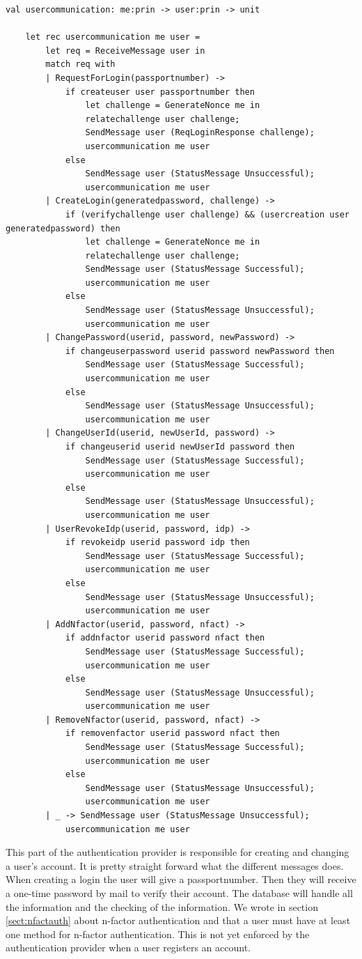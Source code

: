 \documentclass[twosided]{report}
\begin{document}
\begin{lstlisting}[style=fstar, caption={The creation and changing of a user's account}]
	val usercommunication: me:prin -> user:prin -> unit

	let rec usercommunication me user =
		let req = ReceiveMessage user in
		match req with
		| RequestForLogin(passportnumber) -> 
			if createuser user passportnumber then
				let challenge = GenerateNonce me in
				relatechallenge user challenge;
				SendMessage user (ReqLoginResponse challenge);
				usercommunication me user
			else
				SendMessage user (StatusMessage Unsuccessful);
				usercommunication me user
		| CreateLogin(generatedpassword, challenge) ->
			if (verifychallenge user challenge) && (usercreation user generatedpassword) then
				let challenge = GenerateNonce me in
				relatechallenge user challenge;
				SendMessage user (StatusMessage Successful);
				usercommunication me user
			else
				SendMessage user (StatusMessage Unsuccessful);
				usercommunication me user
		| ChangePassword(userid, password, newPassword) ->
			if changeuserpassword userid password newPassword then
				SendMessage user (StatusMessage Successful);
				usercommunication me user
			else
				SendMessage user (StatusMessage Unsuccessful);
				usercommunication me user
		| ChangeUserId(userid, newUserId, password) ->
			if changeuserid userid newUserId password then
				SendMessage user (StatusMessage Successful);
				usercommunication me user
			else
				SendMessage user (StatusMessage Unsuccessful);
				usercommunication me user
		| UserRevokeIdp(userid, password, idp) ->
			if revokeidp userid password idp then
				SendMessage user (StatusMessage Successful);
				usercommunication me user
			else
				SendMessage user (StatusMessage Unsuccessful);
				usercommunication me user
		| AddNfactor(userid, password, nfact) ->
			if addnfactor userid password nfact then
				SendMessage user (StatusMessage Successful);
				usercommunication me user
			else
				SendMessage user (StatusMessage Unsuccessful);
				usercommunication me user
		| RemoveNfactor(userid, password, nfact) ->
			if removenfactor userid password nfact then
				SendMessage user (StatusMessage Successful);
				usercommunication me user
			else
				SendMessage user (StatusMessage Unsuccessful);
				usercommunication me user
		| _ -> SendMessage user (StatusMessage Unsuccessful);
			usercommunication me user
\end{lstlisting}

This part of the authentication provider is responsible for creating and changing a user's account. It is pretty straight forward what the different messages does. When creating a login the user will give a passportnumber. Then they will receive a one-time password by mail to verify their account. The database will handle all the information and the checking of the information. We wrote in section \ref{sect:nfactauth} about n-factor authentication and that a user must have at least one method for n-factor authentication. This is not yet enforced by the authentication provider when a user registers an account.
\end{document}

